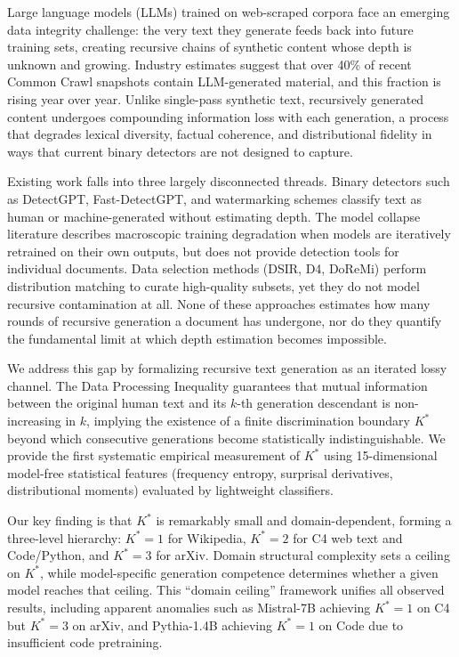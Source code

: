 \documentclass[11pt,a4paper]{article}
\newcommand{\kstar}{K^{*}}
\begin{document}
Large language models (LLMs) trained on web-scraped corpora face an emerging data integrity challenge: the very text they generate feeds back into future training sets, creating recursive chains of synthetic content whose depth is unknown and growing.
Industry estimates suggest that over 40\% of recent Common Crawl snapshots contain LLM-generated material, and this fraction is rising year over year.
Unlike single-pass synthetic text, recursively generated content undergoes compounding information loss with each generation, a process that degrades lexical diversity, factual coherence, and distributional fidelity in ways that current binary detectors are not designed to capture.

Existing work falls into three largely disconnected threads.
Binary detectors such as DetectGPT, Fast-DetectGPT, and watermarking schemes classify text as human or machine-generated without estimating depth.
The model collapse literature describes macroscopic training degradation when models are iteratively retrained on their own outputs, but does not provide detection tools for individual documents.
Data selection methods (DSIR, D4, DoReMi) perform distribution matching to curate high-quality subsets, yet they do not model recursive contamination at all.
None of these approaches estimates how many rounds of recursive generation a document has undergone, nor do they quantify the fundamental limit at which depth estimation becomes impossible.

We address this gap by formalizing recursive text generation as an iterated lossy channel.
The Data Processing Inequality guarantees that mutual information between the original human text and its $k$-th generation descendant is non-increasing in $k$, implying the existence of a finite discrimination boundary $\kstar$ beyond which consecutive generations become statistically indistinguishable.
We provide the first systematic empirical measurement of $\kstar$ using 15-dimensional model-free statistical features (frequency entropy, surprisal derivatives, distributional moments) evaluated by lightweight classifiers.

Our key finding is that $\kstar$ is remarkably small and domain-dependent, forming a three-level hierarchy: $\kstar\!=\!1$ for Wikipedia, $\kstar\!=\!2$ for C4 web text and Code/Python, and $\kstar\!=\!3$ for arXiv.
Domain structural complexity sets a ceiling on $\kstar$, while model-specific generation competence determines whether a given model reaches that ceiling.
This ``domain ceiling'' framework unifies all observed results, including apparent anomalies such as Mistral-7B achieving $\kstar\!=\!1$ on C4 but $\kstar\!=\!3$ on arXiv, and Pythia-1.4B achieving $\kstar\!=\!1$ on Code due to insufficient code pretraining.
\end{document}
